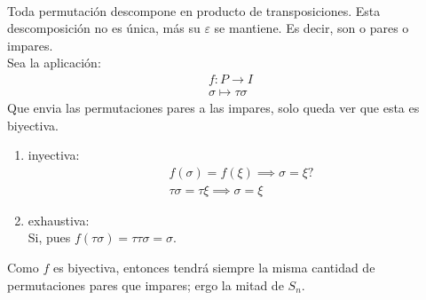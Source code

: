 \begin{solution}
\\Toda permutación descompone en producto de transposiciones. Esta descomposición no es única, más su $\varepsilon$ se mantiene. Es decir, son o pares o impares.\\
Sea la aplicación: \\
\begin{align}
f: P \to I \\
\sigma \mapsto \tau\sigma
\end{align}
Que envia las permutaciones pares a las impares, solo queda ver que esta es biyectiva.\\
\begin{enumerate}
\item inyectiva: \\
\begin{align}
f(\sigma) = f(\xi) \implies \sigma = \xi ?\\
\tau\sigma = \tau\xi \implies \sigma= \xi 
\end{align}
\item exhaustiva: \\
    Si, pues $f(\tau\sigma)= \tau\tau\sigma=\sigma$.
\end{enumerate}
Como $f$ es biyectiva, entonces tendrá siempre la misma cantidad de permutaciones pares que impares; ergo la mitad de $S_n$.
\end{solution}
